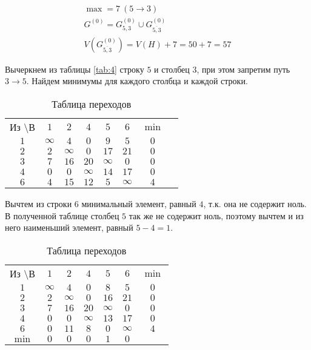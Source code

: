 \begin{gather*}
\max = 7\ (5 \rightarrow 3) \\
G^{(0)} = G_{5,3}^{(0)} \cup G_{\overline{5,3}}^{(0)} \\
V(G_{\overline{5,3}}^{(0)}) = V(H) + 7 = 50 + 7 = 57
\end{gather*}

Вычеркнем из таблицы  \ref{tab:4} строку $5$ и столбец $3$, при этом запретим путь $3 \rightarrow 5$. Найдем минимумы для каждого столбца и каждой строки.

\begin{table}[H]
\begin{center}
	\def\tabcolsep{15pt}
	\caption{Таблица переходов}
	\label{tab:6}
	\begin{tabular}{|c||c|c|c|c|c|c|c|}
		\hline
		Из \textbackslash В & $1$ & $2$ & $4$ & $5$ & $6$ & $\min$ \\
		\hhline{|=#=|=|=|=|=|=|}
		$1$ & $\infty$ & $4$ & $0$ & $9$ & $5$ & $0$ \\
		\hline
		$2$ & $2$ & $\infty$ & $0$ & $17$ & $21$ & $0$ \\
		\hline
		$3$ & $7$ & $16$ & $20$ & $\infty$ & $0$ & $0$ \\ 
		\hline
		$4$ & $0$ & $0$ & $\infty$ & $14$ & $17$ & $0$ \\
		\hline
		$6$ & $4$ & $15$ & $12$ & $5$ & $\infty$ & $4$ \\
		\hline
	\end{tabular}
\end{center}
\end{table}

Вычтем из строки $6$ минимальный элемент, равный $4$, т.к. она не содержит ноль. В полученной таблице столбец $5$ так же не содержит ноль, поэтому вычтем и из него наименьший элемент, равный $5-4 = 1$.

\begin{table}[H]
\begin{center}
	\def\tabcolsep{15pt}
	\caption{Таблица переходов}
	\label{tab:7}
	\begin{tabular}{|c||c|c|c|c|c|c|}
		\hline
		Из \textbackslash В & $1$ & $2$ & $4$ & $5$ & $6$ & $\min$ \\
		\hhline{|=#=|=|=|=|=|=|}
		$1$ & $\infty$ & $4$ & $0$ & $8$ & $5$ & $0$ \\
		\hline
		$2$ & $2$ & $\infty$ & $0$ & $16$ & $21$ & $0$ \\
		\hline
		$3$ & $7$ & $16$ & $20$ & $\infty$ & $0$ & $0$ \\ 
		\hline
		$4$ & $0$ & $0$ & $\infty$ & $13$ & $17$ & $0$ \\
		\hline
		$6$ & $0$ & $11$ & $8$ & $0$ & $\infty$ & $4$ \\
		\hhline{|=#=|=|=|=|=|=|} 
		$\min$ & $0$ & $0$ & $0$ & $1$ & $0$ & \\ 
		\hline
	\end{tabular}
\end{center}
\end{table}

